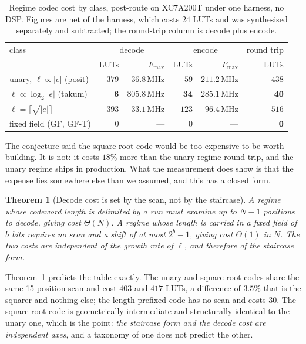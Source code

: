 \documentclass[11pt]{article}
\newtheorem{theorem}{Theorem}
\theoremstyle{definition}
\begin{document}
\begin{table}[t]\centering
\caption{Regime codec cost by class, post-route on XC7A200T under one harness,
no DSP. Figures are net of the harness, which costs $24$ LUTs and was synthesised
separately and subtracted; the round-trip column is decode plus encode.}
\label{tab:regimecost}
\begin{tabular}{lrrrrr}
\toprule
class & \multicolumn{2}{c}{decode} & \multicolumn{2}{c}{encode} & round trip \\
      & LUTs & $F_{\max}$ & LUTs & $F_{\max}$ & LUTs \\
\midrule
unary, $\ell \propto |e|$ (posit)          & $379$ & $36.8$\,MHz  & $59$  & $211.2$\,MHz & $438$ \\
$\ell \propto \log_2|e|$ (takum)           & $\mathbf{6}$ & $\mathbf{805.8}$\,MHz & $\mathbf{34}$ & $\mathbf{285.1}$\,MHz & $\mathbf{40}$ \\
$\ell = \lceil\sqrt{|e|}\rceil$            & $393$ & $33.1$\,MHz  & $123$ & $96.4$\,MHz  & $516$ \\
\midrule
fixed field (GF, GF-T)                     & $0$   & ---          & $0$   & ---          & $\mathbf{0}$ \\
\bottomrule
\end{tabular}
\end{table}

The conjecture said the square-root code would be too expensive to be worth
building. It is not: it costs $18\%$ more than the unary regime round trip, and
the unary regime ships in production. What the measurement does show is that the
expense lies somewhere else than we assumed, and this has a closed form.

\begin{theorem}[Decode cost is set by the scan, not by the staircase]
\label{thm:scan}
A regime whose codeword length is delimited by a run must examine up to $N-1$
positions to decode, giving cost $\Theta(N)$. A regime whose length is carried in
a fixed field of $b$ bits requires no scan and a shift of at most $2^{b}-1$,
giving cost $\Theta(1)$ in $N$. The two costs are independent of the growth rate
of $\ell$, and therefore of the staircase form.
\end{theorem}

Theorem~\ref{thm:scan} predicts the table exactly. The unary and square-root codes
share the same 15-position scan and cost $403$ and $417$ LUTs, a difference of
$3.5\%$ that is the squarer and nothing else; the length-prefixed code has no scan
and costs $30$. The square-root code is geometrically intermediate and structurally
identical to the unary one, which is the point: \emph{the staircase form and the
decode cost are independent axes}, and a taxonomy of one does not predict the
other.
\end{document}
